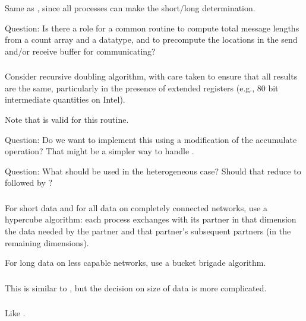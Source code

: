 \documentclass{article}
\begin{document}
\subsubsection{}
Same as , since all processes can make the
short/long determination.

Question: Is there a role for a common routine to compute total message
lengths from a count array and a datatype, and to precompute the locations in
the send and/or receive buffer for communicating?

\subsubsection{}
Consider recursive doubling algorithm, with care taken to ensure that all
results are the same, particularly in the presence of extended registers
(e.g., 80 bit intermediate quantities on Intel).

Note that  is valid for this routine. 

Question: Do we want to implement this using a modification of the accumulate
operation?  That might be a simpler way to handle .

Question: What should be used in the heterogeneous case?  Should that
reduce to  followed by ?

\subsubsection{}
For short data and for all data on completely connected networks, use a
hypercube algorithm: each process exchanges with its partner in that dimension
the data needed by the partner and that partner's subsequent partners (in the
remaining dimensions).

For long data on less capable networks, use a bucket brigade algorithm.

\subsubsection{}
This is similar to , but the decision on size of data is
more complicated.  

\subsubsection{}
Like .
\end{document}
